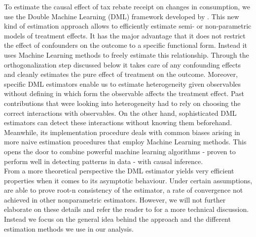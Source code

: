 To estimate the causal effect of tax rebate receipt on changes in consumption, we use the Double Machine Learning (DML) framework developed by \cite{DML2017}. This new kind of estimation approach allows to efficiently estimate semi- or non-parametric models of treatment effects. It has the major advantage that it does not restrict the effect of confounders on the outcome to a specific functional form. Instead it uses Machine Learning methods to freely estimate this relationship. Through the orthogonalization step discussed below it takes care of any confounding effects and cleanly estimates the pure effect of treatment on the outcome. Moreover, specific DML estimators enable us to estimate heterogeneity given observables without defining in which form the observable affects the treatment effect. Past contributions that were looking into heterogeneity had to rely on choosing the correct interactions with observables. On the other hand, sophisticated DML estimators can detect these interactions without knowing them beforehand. \\
Meanwhile, its implementation procedure deals with common biases arising in more naive estimation procedures that employ Machine Learning methods. This opens the door to combine powerful machine learning algorithms - proven to perform well in detecting patterns in data - with causal inference. \\
From a more theoretical perspective the DML estimator yields very efficient properties when it comes to its asymptotic behaviour. Under certain assumptions, \cite{DML2017} are able to prove root-n consistency of the estimator, a rate of convergence not achieved in other nonparametric estimators. However, we will not further elaborate on these details and refer the reader to \cite{DML2017} for a more technical discussion. Instead we focus on the general idea behind the approach and the different estimation methods we use in our analysis.

